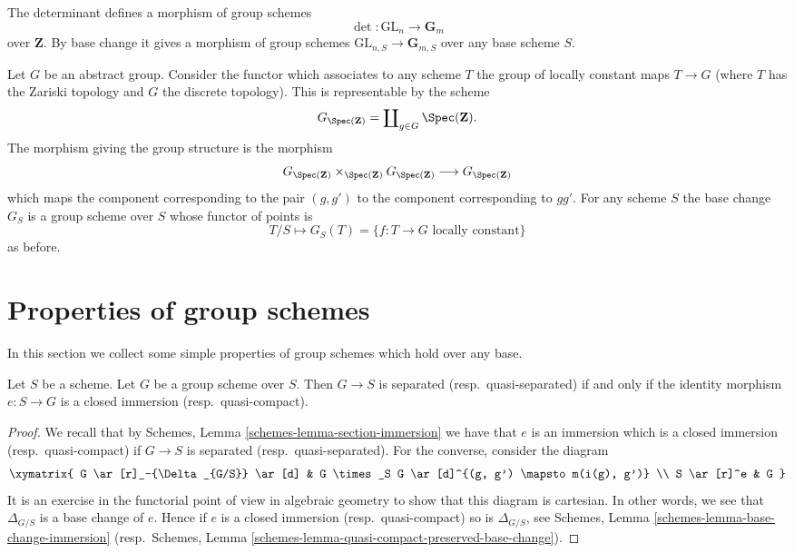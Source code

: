 \begin{example}
\label{example-determinant}
The determinant defines a morphism of group schemes
$$
\det : \text{GL}_n \longrightarrow \mathbf{G}_m
$$
over $\mathbf{Z}$. By base change it gives a morphism
of group schemes $\text{GL}_{n, S} \to \mathbf{G}_{m, S}$
over any base scheme $S$.
\end{example}

\begin{example}
\label{example-constant-group}
Let $G$ be an abstract group. Consider the functor
which associates to any scheme $T$ the group
of locally constant maps $T \to G$ (where $T$ has the Zariski topology
and $G$ the discrete topology). This is representable by the scheme
$$
G_{\Spec(\mathbf{Z})} =
\coprod\nolimits_{g \in G} \Spec(\mathbf{Z}).
$$
The morphism giving the group structure is the morphism
$$
G_{\Spec(\mathbf{Z})}
\times_{\Spec(\mathbf{Z})}
G_{\Spec(\mathbf{Z})}
\longrightarrow
G_{\Spec(\mathbf{Z})}
$$
which maps the component corresponding to the pair $(g, g')$ to the
component corresponding to $gg'$. For any scheme $S$ the base change
$G_S$ is a group scheme over $S$ whose functor of points is
$$
T/S
\longmapsto
G_S(T) = \{f : T \to G \text{ locally constant}\}
$$
as before.
\end{example}





\section{Properties of group schemes}
\label{section-properties-group-schemes}

\noindent
In this section we collect some simple properties of group schemes which
hold over any base.

\begin{lemma}
\label{lemma-group-scheme-separated}
Let $S$ be a scheme.
Let $G$ be a group scheme over $S$.
Then $G \to S$ is separated (resp.\ quasi-separated) if and only if
the identity morphism $e : S \to G$ is a closed immersion
(resp.\ quasi-compact).
\end{lemma}

\begin{proof}
We recall that by
Schemes, Lemma \ref{schemes-lemma-section-immersion}
we have that $e$ is an immersion which is a closed immersion
(resp.\ quasi-compact) if $G \to S$ is separated (resp.\ quasi-separated).
For the converse, consider the diagram
$$
\xymatrix{
G \ar[r]_-{\Delta_{G/S}} \ar[d] &
G \times_S G \ar[d]^{(g, g') \mapsto m(i(g), g')} \\
S \ar[r]^e & G
}
$$
It is an exercise in the functorial point of view in algebraic geometry
to show that this diagram is cartesian. In other words, we see that
$\Delta_{G/S}$ is a base change of $e$. Hence if $e$ is a
closed immersion (resp.\ quasi-compact) so is $\Delta_{G/S}$, see
Schemes, Lemma \ref{schemes-lemma-base-change-immersion}
(resp.\ Schemes, Lemma
\ref{schemes-lemma-quasi-compact-preserved-base-change}).
\end{proof}

